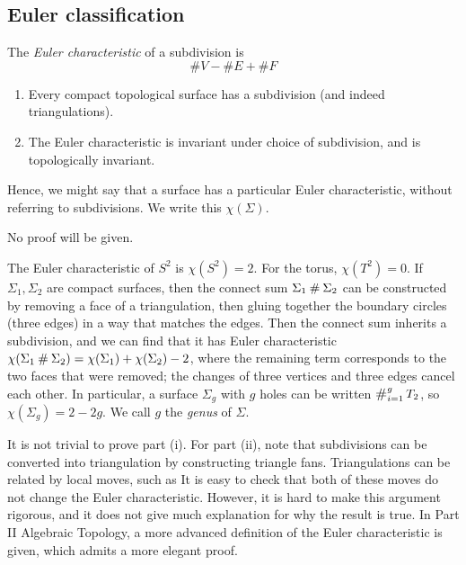 \subsection{Euler classification}
\begin{definition}
	The \textit{Euler characteristic} of a subdivision is
	\[
		\# V - \# E + \# F
	\]
\end{definition}
\begin{theorem}
	\begin{enumerate}
		\item Every compact topological surface has a subdivision (and indeed triangulations).
		\item The Euler characteristic is invariant under choice of subdivision, and is topologically invariant.
	\end{enumerate}
	Hence, we might say that a surface has a particular Euler characteristic, without referring to subdivisions.
	We write this \( \chi(\Sigma) \).
\end{theorem}
No proof will be given.
\begin{example}
	The Euler characteristic of \( S^2 \) is \( \chi(S^2) = 2 \).
	For the torus, \( \chi(T^2) = 0 \).
	If \( \Sigma_1, \Sigma_2 \) are compact surfaces, then the connect sum \( \Sigma_1 \mathbin{\#} \Sigma_2 \) can be constructed by removing a face of a triangulation, then gluing together the boundary circles (three edges) in a way that matches the edges.
	Then the connect sum inherits a subdivision, and we can find that it has Euler characteristic \( \chi(\Sigma_1 \mathbin{\#} \Sigma_2) = \chi(\Sigma_1) + \chi(\Sigma_2) - 2 \), where the remaining term corresponds to the two faces that were removed; the changes of three vertices and three edges cancel each other.
	In particular, a surface \( \Sigma_g \) with \( g \) holes can be written \( \bigconnect_{i=1}^g T_2 \), so \( \chi(\Sigma_g) = 2 - 2g \).
	We call \( g \) the \textit{genus} of \( \Sigma \).
\end{example}
\begin{remark}
	It is not trivial to prove part (i).
	For part (ii), note that subdivisions can be converted into triangulation by constructing triangle fans.
	Triangulations can be related by local moves, such as
	It is easy to check that both of these moves do not change the Euler characteristic.
	However, it is hard to make this argument rigorous, and it does not give much explanation for why the result is true.
	In Part II Algebraic Topology, a more advanced definition of the Euler characteristic is given, which admits a more elegant proof.
\end{remark}
